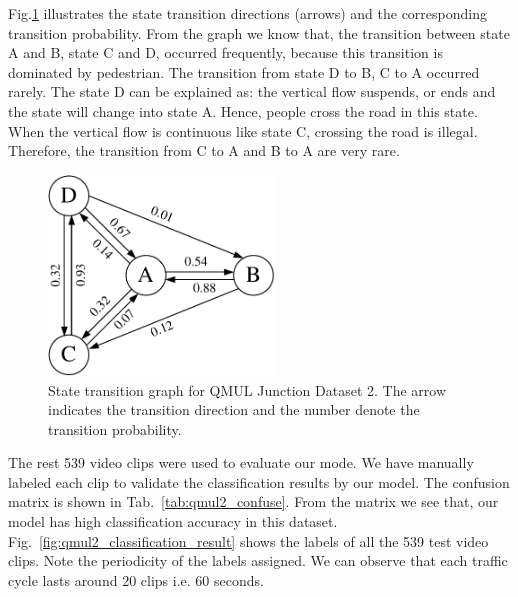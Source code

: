 Fig.\ref{fig:qmul2_transition} illustrates the state transition directions (arrows) and the corresponding transition probability. From the graph we know that, the transition between state A and B, state C and D, occurred frequently, because this transition is dominated by pedestrian. The transition from state D to B, C to A occurred rarely. The state D can be explained as: the vertical flow suspends, or ends and the state will change into state A. Hence, people cross the road in this state. When the vertical flow is continuous like state C, crossing the road is illegal. Therefore, the transition from C to A and B to A are very rare.

\begin{figure}[!htbp]
	\centering
	\includegraphics[width=6cm]{figures/qmul_2/transition-crop.pdf}
	\caption[State transition graph QMUL Junction Dataset 2]{State transition graph for QMUL Junction Dataset 2. The arrow indicates the transition direction and the number denote the transition probability.}
	\label{fig:qmul2_transition}
\end{figure}


The rest 539 video clips were used to evaluate our mode. We have manually labeled each clip to validate the classification results by our model. The confusion matrix is shown in Tab.~\ref{tab:qmul2_confuse}. 
From the matrix we see that, our model has high classification accuracy in this dataset.
Fig.~\ref{fig:qmul2_classification_result} shows the labels of all the 539 test video clips. Note the periodicity of the labels assigned. We can observe that each traffic cycle lasts around 20 clips i.e. 60 seconds.

